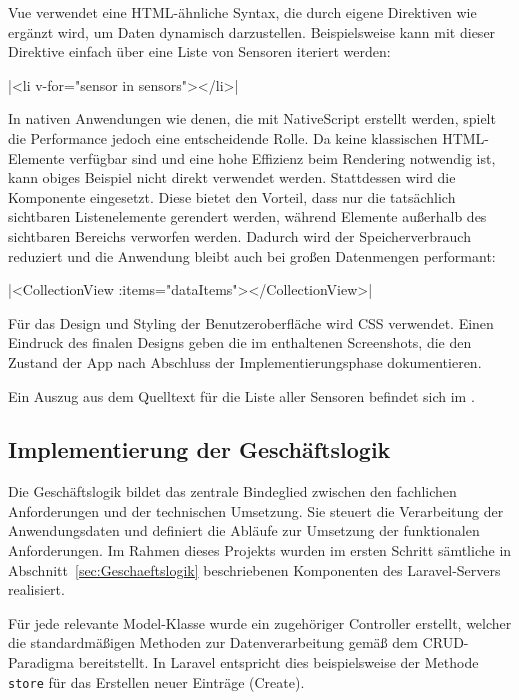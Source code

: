 	Vue verwendet eine HTML-ähnliche Syntax, die durch eigene Direktiven wie  ergänzt wird,
	um Daten dynamisch darzustellen. Beispielsweise kann mit dieser Direktive einfach über eine Liste von Sensoren iteriert werden:

	|<li v-for="sensor in sensors"></li>|

	In nativen Anwendungen wie denen, die mit NativeScript erstellt werden, spielt die Performance jedoch eine entscheidende Rolle.
	Da keine klassischen HTML-Elemente verfügbar sind und eine hohe Effizienz beim Rendering notwendig ist,
	kann obiges Beispiel nicht direkt verwendet werden. Stattdessen wird die Komponente  eingesetzt.
	Diese bietet den Vorteil, dass nur die tatsächlich sichtbaren Listenelemente gerendert werden,
	während Elemente außerhalb des sichtbaren Bereichs verworfen werden.
	Dadurch wird der Speicherverbrauch reduziert und die Anwendung bleibt auch bei großen Datenmengen performant:

	|<CollectionView :items="dataItems"></CollectionView>|

	Für das Design und Styling der Benutzeroberfläche wird CSS verwendet.
	Einen Eindruck des finalen Designs geben die im  enthaltenen Screenshots,
	die den Zustand der App nach Abschluss der Implementierungsphase dokumentieren.

	Ein Auszug aus dem Quelltext für die Liste aller Sensoren befindet sich im .


\subsection{Implementierung der Geschäftslogik}
\label{sec:ImplementierungGeschaeftslogik}
	Die Geschäftslogik bildet das zentrale Bindeglied zwischen den fachlichen Anforderungen und der technischen Umsetzung.
	Sie steuert die Verarbeitung der Anwendungsdaten und definiert die Abläufe zur Umsetzung der funktionalen Anforderungen.
	Im Rahmen dieses Projekts wurden im ersten Schritt sämtliche in
	Abschnitt~\ref{sec:Geschaeftslogik} beschriebenen Komponenten des Laravel-Servers realisiert.

	Für jede relevante Model-Klasse wurde ein zugehöriger Controller erstellt,
	welcher die standardmäßigen Methoden zur Datenverarbeitung gemäß dem \ac{CRUD}-Paradigma bereitstellt.
	In Laravel entspricht dies beispielsweise der Methode \texttt{store} für das Erstellen neuer Einträge (Create).

